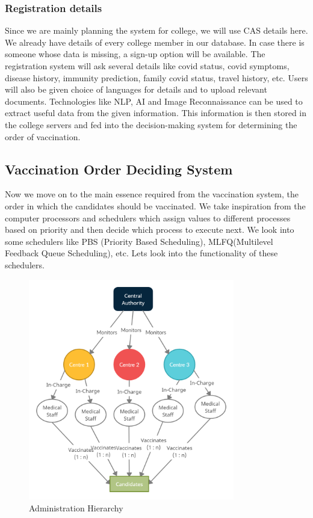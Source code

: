 \documentclass[10pt,twocolumn,letterpaper]{article}
\begin{document}
\subsubsection{Registration details}
Since we are mainly planning the system for college, we will use CAS details here. We already have details of every college member in our database. In case there is someone whose data is missing, a sign-up option will be available. The registration system will ask several details like covid status, covid symptoms, disease history, immunity prediction, family covid status, travel history, etc. Users will also be given choice of languages for details and to upload relevant documents. Technologies like NLP, AI and Image Reconnaissance can be used to extract useful data from the given information. This information is then stored in the college servers and fed into the decision-making system for determining the order of vaccination.

\subsection{Vaccination Order Deciding System}
Now we move on to the main essence required from the vaccination system, the order in which the candidates should be vaccinated. We take inspiration from the computer processors and schedulers which assign values to different processes based on priority and then decide which process to execute next. We look into some schedulers like PBS (Priority Based Scheduling), MLFQ(Multilevel Feedback Queue Scheduling), etc. Lets look into the functionality of these schedulers.
\begin{figure}[htp]
	\includegraphics[width=9cm]{./images/Admin_structure.png}
	\caption{Administration Hierarchy}
	\label{fig:galaxy}
\end{figure}
\end{document}
